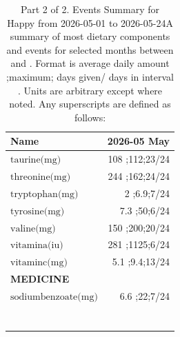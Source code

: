 \begin{table}[H]
\centering
\begin{tabular}{|l|r|}
\hline
Name&2026-05 May\\
\hline
$\textrm{taurine(mg)}$&108 ;112;23/24\\
$\textrm{threonine(mg)}$&244 ;162;24/24\\
$\textrm{tryptophan(mg)}$&2 ;6.9;7/24\\
$\textrm{tyrosine(mg)}$&7.3 ;50;6/24\\
$\textrm{valine(mg)}$&150 ;200;20/24\\
$\textrm{vitamina(iu)}$&281 ;1125;6/24\\
$\textrm{vitaminc(mg)}$&5.1 ;9.4;13/24\\
{\bf MEDICINE}&\\
$\textrm{sodiumbenzoate(mg)}$&6.6 ;22;7/24\\
&\\
&\\
&\\
&\\
&\\
&\\
&\\
\hline
\end{tabular}
\caption{Part 2 of 2.  Events Summary for Happy   from 2026-05-01 to 2026-05-24A summary of most dietary components and events  for selected months between \mjmdateminn and \mjmdatemaxn. Format is average daily amount ;maximum; days given/ days in interval . Units are arbitrary except where noted. Any  superscripts are defined as follows:  \mjmsuperscriptsn}
\end{table}
